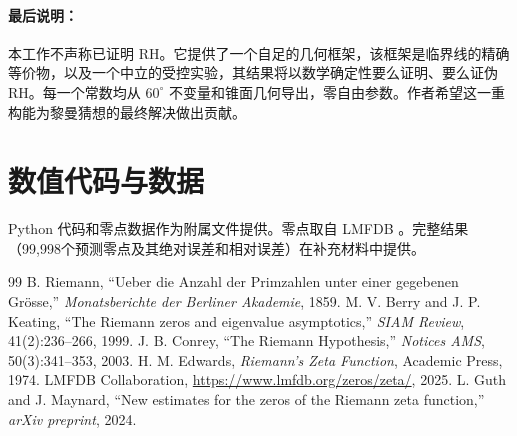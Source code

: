\documentclass[12pt,a4paper]{article}
\begin{document}
\paragraph{最后说明：}
本工作不声称已证明 RH。它提供了一个自足的几何框架，该框架是临界线的精确等价物，以及一个中立的受控实验，其结果将以数学确定性要么证明、要么证伪 RH。每一个常数均从 $60^\circ$ 不变量和锥面几何导出，零自由参数。作者希望这一重构能为黎曼猜想的最终解决做出贡献。

\appendix
\section{数值代码与数据}

Python 代码和零点数据作为附属文件提供。零点取自 LMFDB \cite{lmfdb}。完整结果（99,998个预测零点及其绝对误差和相对误差）在补充材料中提供。

\begin{thebibliography}{99}
 B. Riemann, ``Ueber die Anzahl der Primzahlen unter einer gegebenen Grösse,'' \textit{Monatsberichte der Berliner Akademie}, 1859.
 M. V. Berry and J. P. Keating, ``The Riemann zeros and eigenvalue asymptotics,'' \textit{SIAM Review}, 41(2):236--266, 1999.
 J. B. Conrey, ``The Riemann Hypothesis,'' \textit{Notices AMS}, 50(3):341--353, 2003.
 H. M. Edwards, \textit{Riemann's Zeta Function}, Academic Press, 1974.
 LMFDB Collaboration, \url{https://www.lmfdb.org/zeros/zeta/}, 2025.
 L. Guth and J. Maynard, ``New estimates for the zeros of the Riemann zeta function,'' \textit{arXiv preprint}, 2024.
\end{thebibliography}
\end{document}
